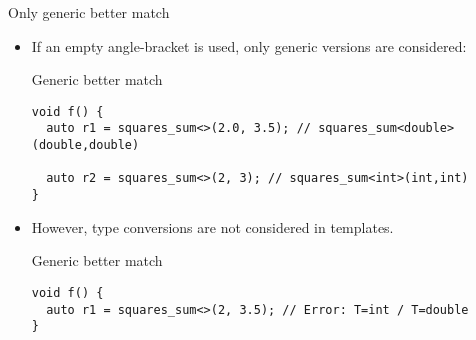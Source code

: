 \begin{frame}[t,fragile]{Only generic better match}
\begin{itemize}
  \item If an empty angle-bracket is used, only generic versions are considered:

\begin{block}{Generic better match}
\begin{lstlisting}
void f() {
  auto r1 = squares_sum<>(2.0, 3.5); // squares_sum<double>(double,double)

  auto r2 = squares_sum<>(2, 3); // squares_sum<int>(int,int)
}
\end{lstlisting}
\end{block}

  \item However, type conversions are not considered in templates.

\begin{block}{Generic better match}
\begin{lstlisting}
void f() {
  auto r1 = squares_sum<>(2, 3.5); // Error: T=int / T=double
}
\end{lstlisting}
\end{block}

\end{itemize}
\end{frame}
